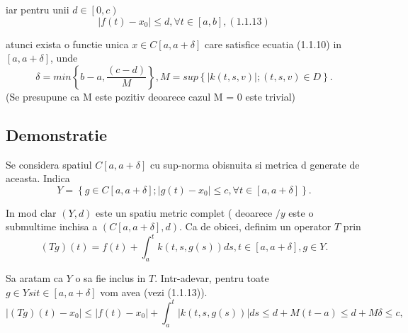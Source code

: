 \documentclass[a4paper,12pt,oneside]{report}
\begin{document}
iar pentru unii \(d \in \left [ 0,c \right )\) 
\begin{displaymath}
  \left | f\left ( t \right ) - x_{0}\right | \leq d, \forall t \in \left [ a,b \right ], (1.1.13)
\end{displaymath}

atunci exista o functie unica \(x\in C \left [ a, a + \delta  \right ]\) care satisfice ecuatia (1.1.10) in  \(\left [ a, a + \delta  \right ]\), unde 
\begin{displaymath}
  \delta  = min \left \{ b-a, \frac{\left ( c-d \right )}{M} \right \}, M = sup \left \{ \left | k\left ( t,s,v \right ) \right |;\left ( t,s,v \right ) \in D \right \}.
\end{displaymath}
(Se presupune ca M este pozitiv deoarece cazul M = 0 este trivial)


\subsection{Demonstratie}

Se considera spatiul \(C \left [ a, a + \delta  \right ]\) cu sup-norma obisnuita si metrica d generate de aceasta.  Indica 
\begin{displaymath}
  Y = \left \{ g\in C \left [ a,a+\delta  \right ] ; \left | g\left ( t \right ) - x_{0}\right | \leq c, \forall t \in \left [ a, a+\delta  \right ]\right \}. 
\end{displaymath}

	In mod clar \(\left ( Y,d \right )\) este un spatiu metric complet ( deoarece \(/y\) este o submultime inchisa a \(\left ( C \left [ a, a + \delta  \right ] , d \right )\). Ca de obicei, definim un operator \(T\) prin
 \begin{displaymath}
  \left ( Tg \right )\left ( t \right ) = f\left ( t \right ) + \int_{a}^{t}k\left ( t,s,g\left ( s \right ) \right )ds, t\in \left [ a, a + \delta  \right ], g\in Y. 
\end{displaymath}

	Sa aratam ca \(Y\) o sa fie inclus in \(T\). Intr-adevar, pentru toate \(g\in Y si t\in \left [ a, a+ \delta  \right ]\) vom avea (vezi (1.1.13)). 
\begin{displaymath}
  \left | \left ( Tg \right )\left ( t \right ) - x_{0}\right | \leq \left | f\left ( t \right )-x_{0} \right | + \int_{a}^{t}\left | k\left ( t,s,g\left ( s \right ) \right ) \right |ds \leq d + M\left ( t-a \right ) \leq  d+ M\delta  \leq  c,
\end{displaymath}
 
\end{document}

